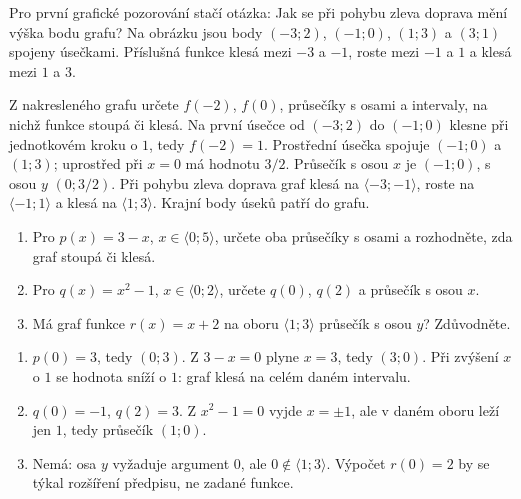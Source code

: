 \documentclass[11pt,a4paper]{article}
\begin{document}
Pro první grafické pozorování stačí otázka: Jak se při pohybu zleva doprava mění výška bodu grafu? Na obrázku jsou body $(-3;2)$, $(-1;0)$, $(1;3)$ a $(3;1)$ spojeny úsečkami. Příslušná funkce klesá mezi $-3$ a $-1$, roste mezi $-1$ a $1$ a klesá mezi $1$ a $3$.
\begin{center}
\end{center}
\begin{prikladReseniBox}
Z nakresleného grafu určete $f(-2)$, $f(0)$, průsečíky s osami a intervaly, na nichž funkce stoupá či klesá.
\tcblower
Na první úsečce od $(-3;2)$ do $(-1;0)$ klesne při jednotkovém kroku o $1$, tedy $f(-2)=1$. Prostřední úsečka spojuje $(-1;0)$ a $(1;3)$; uprostřed při $x=0$ má hodnotu $3/2$. Průsečík s osou $x$ je $(-1;0)$, s osou $y$ $(0;3/2)$. Při pohybu zleva doprava graf klesá na $\langle-3;-1\rangle$, roste na $\langle-1;1\rangle$ a klesá na $\langle1;3\rangle$. Krajní body úseků patří do grafu.
\end{prikladReseniBox}
\begin{zadaniReseniBox}
\begin{enumerate}[label=\alph*)]
\item Pro $p(x)=3-x$, $x\in\langle0;5\rangle$, určete oba průsečíky s osami a rozhodněte, zda graf stoupá či klesá.
\item Pro $q(x)=x^2-1$, $x\in\langle0;2\rangle$, určete $q(0)$, $q(2)$ a průsečík s osou $x$.
\item Má graf funkce $r(x)=x+2$ na oboru $\langle1;3\rangle$ průsečík s osou $y$? Zdůvodněte.
\end{enumerate}
\tcblower
\begin{enumerate}[label=\alph*)]
\item $p(0)=3$, tedy $(0;3)$. Z $3-x=0$ plyne $x=3$, tedy $(3;0)$. Při zvýšení $x$ o $1$ se hodnota sníží o $1$: graf klesá na celém daném intervalu.
\item $q(0)=-1$, $q(2)=3$. Z $x^2-1=0$ vyjde $x=\pm1$, ale v daném oboru leží jen $1$, tedy průsečík $(1;0)$.
\item Nemá: osa $y$ vyžaduje argument $0$, ale $0\notin\langle1;3\rangle$. Výpočet $r(0)=2$ by se týkal rozšíření předpisu, ne zadané funkce.
\end{enumerate}
\end{zadaniReseniBox}
\end{document}
